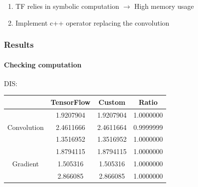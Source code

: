 \documentclass[aspectratio=43]{beamer}
\begin{document}
\begin{frame}
	
	\begin{enumerate}
		\item TF relies in symbolic computation $\longrightarrow$ High memory usage
		\item Implement c++ operator replacing the convolution
	\end{enumerate}

\end{frame}

\begin{frame}

	\frametitle{Results}
	\framesubtitle{Checking computation}
	
	{\Large DIS:}
	\begin{table}
		\centering
		\begin{tabular}{c c c c}
			& TensorFlow & Custom & Ratio \\ \hline
			& 1.9207904 & 1.9207904 & {\color{darkgreen} 1.0000000} \\
			Convolution & 2.4611666 & 2.4611664 & {\color{darkgreen} 0.9999999} \\
			& 1.3516952 & 1.3516952 & {\color{darkgreen} 1.0000000} \\
			\hline
			& 1.8794115 & 1.8794115 & {\color{darkgreen} 1.0000000} \\
			Gradient & 1.505316 & 1.505316 & {\color{darkgreen} 1.0000000} \\
			& 2.866085 & 2.866085 & {\color{darkgreen} 1.0000000} \\
			\hline
		\end{tabular}
	\end{table}

\end{frame}
\end{document}
